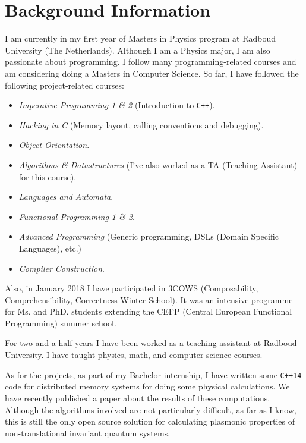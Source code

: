 \documentclass[a4paper,12pt]{article}
\begin{document}
\section{Background Information}
    I am currently in my first year of Masters in Physics program at Radboud
    University (The Netherlands). Although I am a Physics major, I am also
    passionate about programming. I follow many programming-related courses
    and am considering doing a Masters in Computer Science. So far, I have
    followed the following project-related courses:
    \begin{itemize}
        \item \textit{Imperative Programming 1 \& 2} (Introduction to \texttt{C++}).
        \item \textit{Hacking in C} (Memory layout, calling conventions and
            debugging).
        \item \textit{Object Orientation}.
        \item \textit{Algorithms \& Datastructures} (I've also worked as a
            TA (Teaching Assistant) for this course).
        \item \textit{Languages and Automata}.
        \item \textit{Functional Programming 1 \& 2}.
        \item \textit{Advanced Programming} (Generic programming, DSLs (Domain
            Specific Languages), etc.)
        \item \textit{Compiler Construction}.
    \end{itemize}

    Also, in January 2018 I have participated in 3COWS (Composability,
    Comprehensibility, Correctness Winter School). It was an intensive programme
    for Ms. and PhD. students extending the CEFP (Central European Functional
    Programming) summer school.

    For two and a half years I have been worked as a teaching assistant at
    Radboud University. I have taught physics, math, and computer science
    courses.

    As for the projects, as part of my Bachelor internship, I have written some
    \texttt{C++14} code for distributed memory systems for doing some physical
    calculations. We have recently published a paper about the results of these
    computations. Although the algorithms involved are not particularly
    difficult, as far as I know, this is still the only open source solution for
    calculating plasmonic properties of non-translational invariant quantum
    systems.
\end{document}
